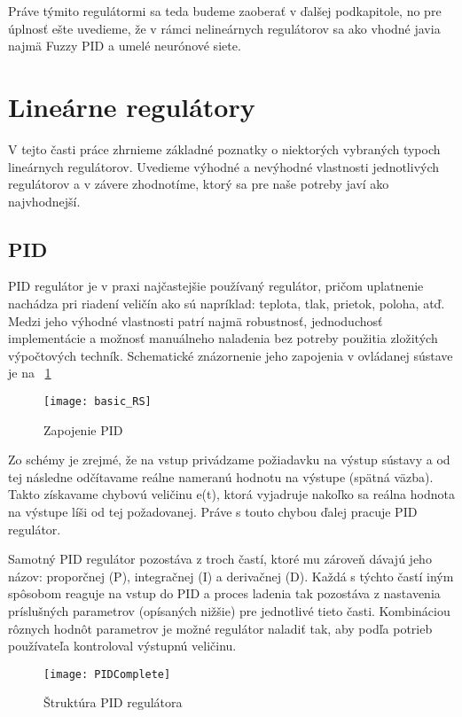 Práve týmito regulátormi sa teda budeme zaoberať v ďalšej podkapitole, no pre úplnosť ešte uvedieme, že v rámci nelineárnych regulátorov sa ako vhodné javia najmä Fuzzy PID a umelé neurónové siete.

\section{Lineárne regulátory}


V tejto časti práce zhrnieme základné poznatky o niektorých vybraných typoch lineárnych regulátorov. Uvedieme výhodné a nevýhodné vlastnosti jednotlivých regulátorov a v závere zhodnotíme, ktorý sa pre naše potreby javí ako najvhodnejší.

\subsection{PID}


\ac{PID} regulátor je v praxi najčastejšie používaný regulátor, pričom uplatnenie nachádza  pri riadení veličín ako sú napríklad: teplota, tlak, prietok, poloha, atď. Medzi jeho výhodné vlastnosti patrí najmä robustnosť, jednoduchosť implementácie a možnosť manuálneho naladenia bez potreby použitia zložitých výpočtových techník.  Schematické znázornenie jeho zapojenia v ovládanej sústave je na \figurename~\ref{fig:PIDSchematic}

\begin{figure}[h!]
\centering
\texttt{[image: basic\_RS]}
\caption{Zapojenie PID}
\label{fig:PIDSchematic}
\end{figure}

Zo schémy je zrejmé, že na vstup privádzame požiadavku na výstup sústavy a od tej následne odčítavame reálne nameranú hodnotu na výstupe (spätná väzba). Takto získavame chybovú veličinu e(t), ktorá vyjadruje nakoľko sa reálna hodnota na výstupe líši od tej požadovanej. Práve s touto chybou ďalej pracuje \ac{PID} regulátor.

Samotný PID regulátor pozostáva z troch častí, ktoré mu zároveň dávajú jeho názov: proporčnej (P), integračnej (I) a derivačnej (D). Každá s týchto častí iným spôsobom reaguje na vstup do PID a proces ladenia tak pozostáva z nastavenia príslušných parametrov (opísaných nižšie) pre jednotlivé tieto časti. Kombináciou rôznych hodnôt parametrov je možné regulátor naladiť tak, aby podľa potrieb používateľa kontroloval výstupnú veličinu. 

\begin{figure}[h!]
\centering
\texttt{[image: PIDComplete]}
\caption{Štruktúra PID regulátora}
\label{fig:PIDComplete}
\end{figure}

